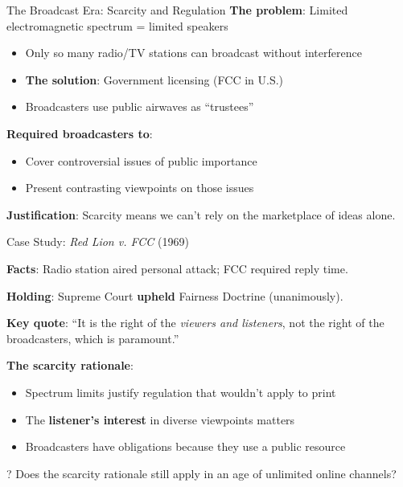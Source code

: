 ﻿\documentclass[aspectratio=169]{beamer}
\begin{document}
\begin{frame}{The Broadcast Era: Scarcity and Regulation}
\textbf{The problem}: Limited electromagnetic spectrum = limited speakers

\begin{itemize}
    \item Only so many radio/TV stations can broadcast without interference
    \item \textbf{The solution}: Government licensing (FCC in U.S.)
    \item Broadcasters use public airwaves as ``trustees''
\end{itemize}

\vspace{0.3cm}
\begin{casestudybox}
\textbf{Required broadcasters to}:
\begin{itemize}
    \item Cover controversial issues of public importance
    \item Present contrasting viewpoints on those issues
\end{itemize}
\textbf{Justification}: Scarcity means we can't rely on the marketplace of ideas alone.
\end{casestudybox}
\end{frame}

\begin{frame}{Case Study: \textit{Red Lion v. FCC} (1969)}
\begin{casestudybox}
\textbf{Facts}: Radio station aired personal attack; FCC required reply time.

\textbf{Holding}: Supreme Court \textbf{upheld} Fairness Doctrine (unanimously).

\textbf{Key quote}: ``It is the right of the \textit{viewers and listeners}, not the right of the broadcasters, which is paramount.''
\end{casestudybox}

\vspace{0.3cm}
\textbf{The scarcity rationale}:
\begin{itemize}
    \item Spectrum limits justify regulation that wouldn't apply to print
    \item The \textbf{listener's interest} in diverse viewpoints matters
    \item Broadcasters have obligations because they use a public resource
\end{itemize}

\begin{alertblock}{?}
Does the scarcity rationale still apply in an age of unlimited online channels?
\end{alertblock}
\end{frame}
\end{document}
